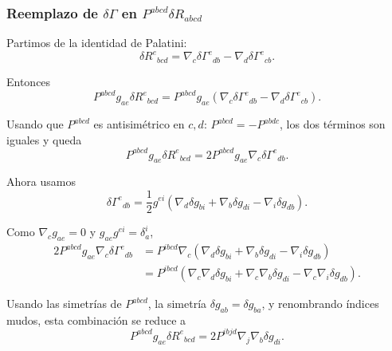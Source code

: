 \documentclass{beamer}
\begin{document}
\begin{frame}[label=nav-frame-029]
\frametitle{Reemplazo de \(\delta\Gamma\) en \(P^{abcd}\delta R_{abcd}\)}
\scriptsize

Partimos de la identidad de Palatini:
\[
\delta R^{e}{}_{bcd}
=
\nabla_c\delta\Gamma^{e}{}_{db}
-
\nabla_d\delta\Gamma^{e}{}_{cb}.
\]

Entonces
\[
P^{abcd}g_{ae}\delta R^{e}{}_{bcd}
=
P^{abcd}g_{ae}
\left(
\nabla_c\delta\Gamma^{e}{}_{db}
-
\nabla_d\delta\Gamma^{e}{}_{cb}
\right).
\]

Usando que \(P^{abcd}\) es antisimétrico en \(c,d\): $P^{abcd}=-P^{abdc}$, los dos términos son iguales y queda
\[
P^{abcd}g_{ae}\delta R^{e}{}_{bcd}
=
2P^{abcd}g_{ae}\nabla_c\delta\Gamma^{e}{}_{db}.
\]


Ahora usamos
\[
\delta\Gamma^{e}{}_{db}
=
\frac12 g^{ei}
\left(
\nabla_d\delta g_{bi}
+
\nabla_b\delta g_{di}
-
\nabla_i\delta g_{db}
\right).
\]

Como \(\nabla_c g_{ae}=0\) y \(g_{ae}g^{ei}=\delta^i_a\),
\[
\begin{aligned}
2P^{abcd}g_{ae}\nabla_c\delta\Gamma^{e}{}_{db}
&=
P^{ibcd}\nabla_c
\left(
\nabla_d\delta g_{bi}
+
\nabla_b\delta g_{di}
-
\nabla_i\delta g_{db}
\right)
\\
&=
P^{ibcd}
\left(
\nabla_c\nabla_d\delta g_{bi}
+
\nabla_c\nabla_b\delta g_{di}
-
\nabla_c\nabla_i\delta g_{db}
\right).
\end{aligned}
\]


Usando las simetrías de \(P^{abcd}\), la simetría
\(\delta g_{ab}=\delta g_{ba}\), y renombrando índices mudos, esta combinación se reduce a
\begin{equation}
\boxed{
P^{abcd}g_{ae}\delta R^{e}{}_{bcd}
=
2P^{ibjd}\nabla_j\nabla_b\delta g_{di}.
}
\label{eq:doble-derivada-variacion-metrica}
\end{equation}

\end{frame}
\end{document}
